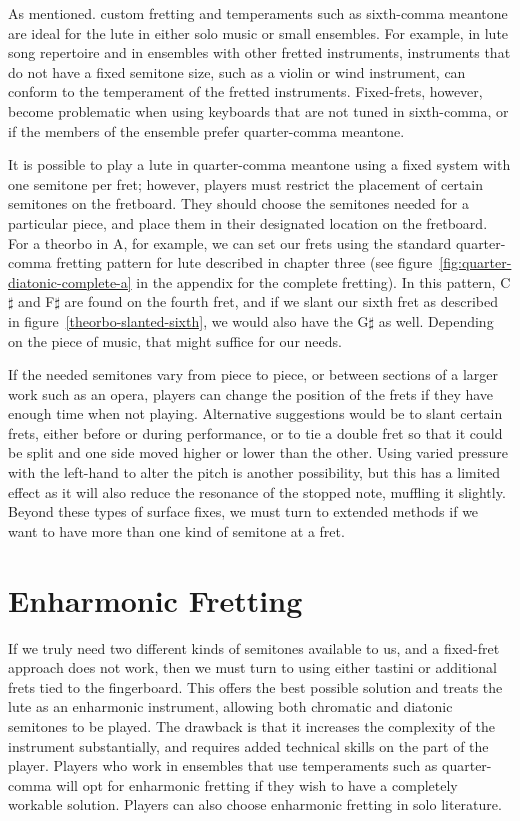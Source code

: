As mentioned. custom fretting and temperaments such as sixth-comma meantone are ideal for the lute
in either solo music or small ensembles.  For example, in lute song repertoire and in ensembles with
other fretted instruments, instruments that do not have a fixed semitone size, such as a violin or
wind instrument, can conform to the temperament of the fretted instruments. Fixed-frets, however,
become problematic when using keyboards that are not tuned in sixth-comma, or if the members of the
ensemble prefer quarter-comma meantone.

It is possible to play a lute in quarter-comma meantone using a fixed system with one semitone per
fret; however, players must restrict the placement of certain semitones on the fretboard.  They
should choose the semitones needed for a particular piece, and place them in their designated
location on the fretboard.  For a theorbo in A, for example, we can set our frets using the standard
quarter-comma fretting pattern for lute described in chapter three 
(see figure~\ref{fig:quarter-diatonic-complete-a} in the appendix for the complete fretting).  
In this pattern, C$\sharp$ and F$\sharp$ are found on the fourth fret, and if we slant our sixth 
fret as described in figure~\ref{theorbo-slanted-sixth}, we would also have the G$\sharp$ as well. 
Depending on the piece of music, that might suffice for our needs.

If the needed semitones vary from piece to piece, or between sections of a larger work such as an
opera, players can change the position of the frets if they have enough time when not playing.
Alternative suggestions would be to slant certain frets, either before or during performance, or to
tie a double fret so that it could be split and one side moved higher or lower than the other. Using
varied pressure with the left-hand to alter the pitch is another possibility, but this has a limited
effect as it will also reduce the resonance of the stopped note, muffling it slightly. Beyond these
types of surface fixes, we must turn to extended methods if we want to have more than one kind of
semitone at a fret.

\section{Enharmonic Fretting}

If we truly need two different kinds of semitones available to us, and a fixed-fret
approach does not work, then we must turn to using either tastini or additional frets
tied to the fingerboard.  This offers the best possible solution and treats the lute as
an enharmonic instrument, allowing both chromatic and diatonic semitones to be
played. The drawback is that it increases the complexity of the instrument substantially,
and requires added technical skills on the part of the player. Players who work in
ensembles that use temperaments such as quarter-comma will opt for enharmonic fretting
if they wish to have a completely workable solution. Players can also choose
enharmonic fretting in solo literature.


